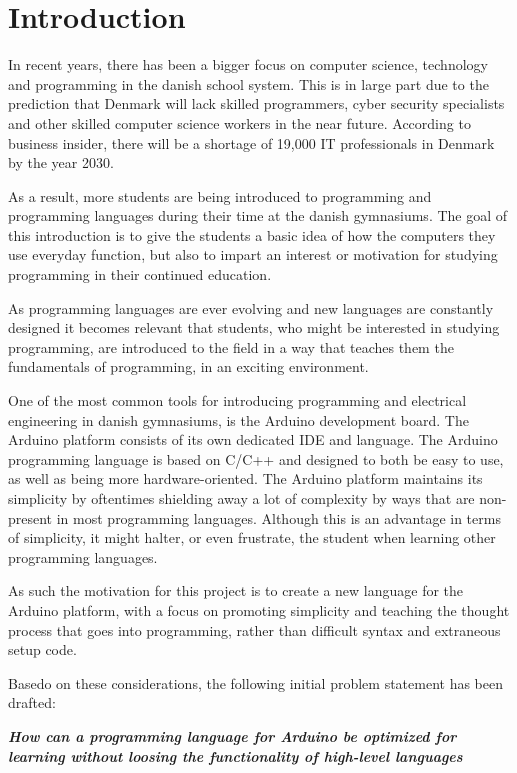 
\chapter{Introduction}
In recent years, there has been a bigger focus on computer science, technology and programming in the danish school system.
This is in large part due to the prediction that Denmark will lack skilled programmers, cyber security specialists and other skilled computer science workers in the near future.
According to business insider, there will be a shortage of 19,000 IT professionals in Denmark by the year 2030.\cite{ITLackDK}

As a result, more students are being introduced to programming and programming languages during their time at the
danish gymnasiums. 
The goal of this introduction is to give the students a basic idea of how the computers they use everyday function, but also to impart an interest or motivation for studying programming in their continued education.

As programming languages are ever evolving and new languages are constantly designed it becomes relevant
that students, who might be interested in studying programming, are introduced to the field in a way that
teaches them the fundamentals of programming, in an exciting environment.

One of the most common tools for introducing programming and electrical engineering in danish gymnasiums, is the Arduino development board. 
The Arduino platform consists of its own dedicated IDE and language.
The Arduino programming language is based on C/C++ and designed to both be easy to use, as well as being
more hardware-oriented.\cite{ArFAQ}
The Arduino platform maintains its simplicity by oftentimes shielding away a lot of complexity by ways
that are non-present in most programming languages.
Although this is an advantage in terms of simplicity, it might halter, or even frustrate, the student when learning other programming languages.

As such the motivation for this project is to create a new language for the Arduino platform, with a focus on promoting simplicity and teaching the thought process that goes into programming, rather than difficult syntax and extraneous setup code.


Basedo on these considerations, the following initial problem statement has been drafted:

\begin{center}
	\textit{\textbf{How can a programming language for Arduino be optimized for learning without 
			loosing the functionality of high-level languages}}
\end{center}
